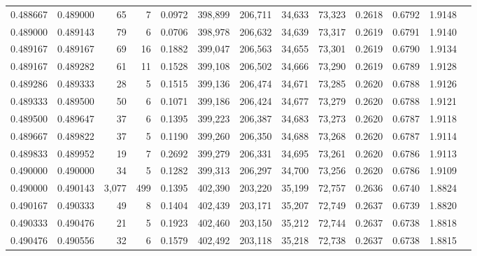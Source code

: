 \begin{tabular}{rrrrrrrrrrrrr}
0.488667 & 0.489000 &    65 &   7 &                                     0.0972 & 398,899 & 206,711 &  34,633 &  73,323 & 0.2618 & 0.6792 & 1.9148 \\
0.489000 & 0.489143 &    79 &   6 &                                     0.0706 & 398,978 & 206,632 &  34,639 &  73,317 & 0.2619 & 0.6791 & 1.9140 \\
0.489167 & 0.489167 &    69 &  16 &                                     0.1882 & 399,047 & 206,563 &  34,655 &  73,301 & 0.2619 & 0.6790 & 1.9134 \\
0.489167 & 0.489282 &    61 &  11 &                                     0.1528 & 399,108 & 206,502 &  34,666 &  73,290 & 0.2619 & 0.6789 & 1.9128 \\
0.489286 & 0.489333 &    28 &   5 &                                     0.1515 & 399,136 & 206,474 &  34,671 &  73,285 & 0.2620 & 0.6788 & 1.9126 \\
0.489333 & 0.489500 &    50 &   6 &                                     0.1071 & 399,186 & 206,424 &  34,677 &  73,279 & 0.2620 & 0.6788 & 1.9121 \\
0.489500 & 0.489647 &    37 &   6 &                                     0.1395 & 399,223 & 206,387 &  34,683 &  73,273 & 0.2620 & 0.6787 & 1.9118 \\
0.489667 & 0.489822 &    37 &   5 &                                     0.1190 & 399,260 & 206,350 &  34,688 &  73,268 & 0.2620 & 0.6787 & 1.9114 \\
0.489833 & 0.489952 &    19 &   7 &                                     0.2692 & 399,279 & 206,331 &  34,695 &  73,261 & 0.2620 & 0.6786 & 1.9113 \\
0.490000 & 0.490000 &    34 &   5 &                                     0.1282 & 399,313 & 206,297 &  34,700 &  73,256 & 0.2620 & 0.6786 & 1.9109 \\
0.490000 & 0.490143 & 3,077 & 499 &                                     0.1395 & 402,390 & 203,220 &  35,199 &  72,757 & 0.2636 & 0.6740 & 1.8824 \\
0.490167 & 0.490333 &    49 &   8 &                                     0.1404 & 402,439 & 203,171 &  35,207 &  72,749 & 0.2637 & 0.6739 & 1.8820 \\
0.490333 & 0.490476 &    21 &   5 &                                     0.1923 & 402,460 & 203,150 &  35,212 &  72,744 & 0.2637 & 0.6738 & 1.8818 \\
0.490476 & 0.490556 &    32 &   6 &                                     0.1579 & 402,492 & 203,118 &  35,218 &  72,738 & 0.2637 & 0.6738 & 1.8815 \\

\end{tabular}
